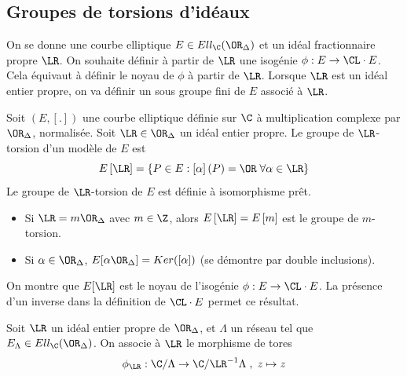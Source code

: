 \subsection{Groupes de torsions d'idéaux}

On se donne une courbe elliptique $E\in Ell_{\C}(\OR_{\Delta})$ et un idéal fractionnaire propre $\LR$. On souhaite définir à partir de $\LR$ une isogénie $\phi : E\rightarrow \CL\cdot E$. Cela équivaut à définir le noyau de $\phi$ à partir de $\LR$. Lorsque $\LR$ est un idéal entier propre, on va définir un sous groupe fini de $E$ associé à $\LR$.

\begin{Def}
	Soit $(E,[.])$ une courbe elliptique définie sur $\C$ à multiplication complexe par $\OR_{\Delta}$, normalisée. Soit $\LR\in\OR_{\Delta}$ un idéal entier propre. Le groupe de $\LR$-torsion d'un modèle de $E$ est 
	\begin{equation*}
		E\left[ \LR\right] = \left\lbrace P\in E : \left[ \alpha\right] (P) = \OR \; \forall\alpha\in\LR \right\rbrace 
	\end{equation*}
	Le groupe de $\LR$-torsion de $E$ est définie à isomorphisme prêt.
\end{Def}




\begin{Ex}
	\begin{itemize}
		
		\item Si $\LR = m\OR_{\Delta}$ avec $m\in\Z$, alors $E\left[ \LR\right] = E\left[ m\right] $ est le groupe de $m$-torsion.
		
		\item Si $\alpha\in\OR_{\Delta}$, $E[\alpha\OR_{\Delta}] = Ker([\alpha])$ (se démontre par double inclusions).
		
	\end{itemize}
	
\end{Ex}

On montre que $E[\LR]$ est le noyau de l'isogénie $\phi : E\rightarrow \CL\cdot E$. La présence d'un inverse dans la définition de $\CL\cdot E$ permet ce résultat.

\begin{Def}
	Soit $\LR$ un idéal entier propre de $\OR_{\Delta}$, et $\Lambda$ un réseau tel que $E_{\Lambda}\in Ell_{\C}(\OR_{\Delta})$. On associe à $\LR$ le morphisme de tores
	\begin{equation*}
		\phi_{\LR} : \C/\Lambda\rightarrow\C/\LR^{-1}\Lambda\; , \; z\mapsto z
	\end{equation*}
	
	
\end{Def}

